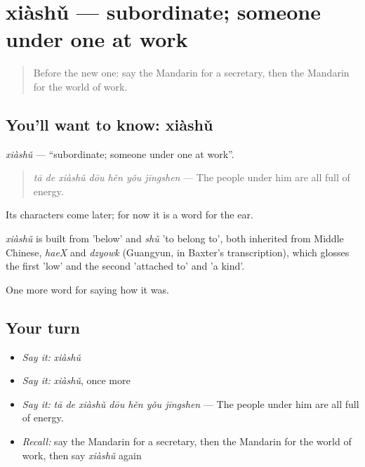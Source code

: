 \section[xiàshǔ]{xiàshǔ — subordinate; someone under one at work}

\label{lesson:ZH-C491-xiashu}



\begin{quote}
Before the new one: say the Mandarin for a secretary, then the Mandarin for the world of work.
\end{quote}

\subsection*{You'll want to know: xiàshǔ}
\emph{xiàshǔ} — \textquotedblleft{}subordinate; someone under one at work\textquotedblright{}.

\begin{quote}
\emph{tā de xiàshǔ dōu hěn yǒu jīngshen} — The people under him are all full of energy.
\end{quote}

Its characters come later; for now it is a word for the ear.

\begin{cousinweb}
\emph{xiàshǔ} is built from  'below' and \emph{shǔ} 'to belong to', both inherited from Middle Chinese, \emph{haeX} and \emph{dzyowk} (Guangyun, in Baxter's transcription), which glosses the first 'low' and the second 'attached to' and 'a kind'.
\end{cousinweb}

\begin{grammarlens}[title={What you've built}]
One more word for saying how it was.
\end{grammarlens}

\subsection*{Your turn}
\begin{itemize}
\raggedright
  \item \emph{Say it:} \emph{xiàshǔ}
  \item \emph{Say it:} \emph{xiàshǔ}, once more
  \item \emph{Say it:} \emph{tā de xiàshǔ dōu hěn yǒu jīngshen} — The people under him are all full of energy.
  \item \emph{Recall:} say the Mandarin for a secretary, then the Mandarin for the world of work, then say \emph{xiàshǔ} again
\end{itemize}

